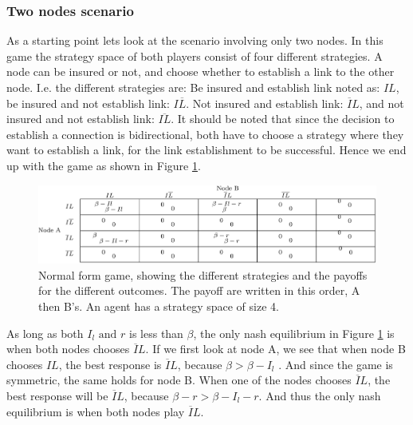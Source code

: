 \subsubsection{Two nodes scenario}
As a starting point lets look at the scenario involving only two nodes. In this game the strategy space of both players consist of four different strategies. A node can be insured or not, and choose whether to establish a link to the other node. I.e. the different strategies are: Be insured and establish link noted as: $IL$, 
be insured and not establish link: $I\overline{L}$. Not insured and establish link: $\overline{I}L$, and not insured and not establish link: $\overline{IL}$. It should be noted that since the decision to establish a connection is bidirectional, both have to choose a strategy where they want to establish a link, for the link establishment to be successful. Hence we end up with the game as shown in Figure \ref{fig:FirstGameTheoryModel}.

\begin{figure} 
\centering
\includegraphics[width=1.0\textwidth]{../Figures/FirstGameWithParameters.png}
\caption{\label{fig:FirstGameTheoryModel} Normal form game, showing the different strategies and the payoffs  for the different outcomes. The payoff are written in this order, A then B's. An agent has a strategy space of size 4.}
\end{figure}

As long as both $I_{l} \text{ and } r$ is less than $\beta$, the only nash equilibrium in Figure \ref{fig:FirstGameTheoryModel} is when both nodes chooses $\overline{I}L$. If we first look at node A, we see that when node B chooses $IL$, the best response is $\overline{I}L$, because $ \beta >\beta- I_{l}$ . And since the game is symmetric, the same holds for node B. 
When one of the nodes chooses $\overline{I}L$, the best response will be $\overline{I}L$, because $\beta - r>\beta - I_{l} - r  $. 
And thus the only nash equilibrium is when both nodes play $\overline{I}L$.

